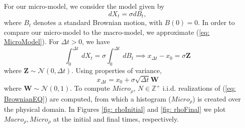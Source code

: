 \documentclass[10pt]{article}
\begin{document}
\noindent For our micro-model, we consider the model given by
\begin{equation}
dX_t = \sigma dB_t,
\label{eq: MicroModel}
\end{equation}
where $B_t$ denotes a standard Brownian motion, with $B(0) = 0$. In order to compare our micro-model to the macro-model, we approximate (\ref{eq: MicroModel}). For $\Delta t > 0$, we have
\begin{equation}
\int_0^{\Delta t} \ dX_t = \sigma \int_{0}^{\Delta t} \ dB_t \implies x_{\Delta t} - x_0 = \sigma \textbf{Z}
\end{equation}
where $\textbf{Z} \sim \mathcal{N}(0, \Delta t)$. Using properties of variance, 
\begin{equation}
x_{\Delta t} = x_0 + \sigma \sqrt{\Delta t}\textbf{W}
\label{eq: BrownianEQ}
\end{equation} 
where $\textbf{W} \sim \mathcal{N}(0, 1)$. To compute $Micro_{\rho}$, $N \in \mathbb{Z}^+$ i.i.d. realizations of (\ref{eq: BrownianEQ}) are computed, from which a histogram ($Micro_{\rho}$) is created over the physical domain.  In Figures \ref{fig: rhoInitial} and \ref{fig: rhoFinal} we plot $Macro_{\rho}, Micro_{\rho}$ at the initial and final times, respectively.
\end{document}
